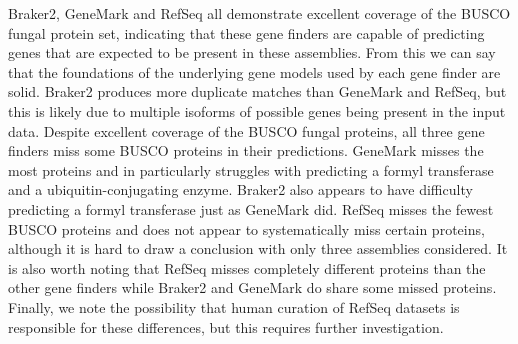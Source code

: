 
Braker2, GeneMark and RefSeq all demonstrate excellent coverage of the
BUSCO fungal protein set, indicating that these gene finders are
capable of predicting genes that are expected to be present in these
assemblies. From this we can say that the foundations of the
underlying gene models used by each gene finder are solid. Braker2
produces more duplicate matches than GeneMark and RefSeq, but this is
likely due to multiple isoforms of possible genes being present in the
input data. Despite excellent coverage of the BUSCO fungal proteins,
all three gene finders miss some BUSCO proteins in their
predictions. GeneMark misses the most proteins and in particularly
struggles with predicting a formyl transferase and a
ubiquitin-conjugating enzyme. Braker2 also appears to have difficulty
predicting a formyl transferase just as GeneMark did. RefSeq misses
the fewest BUSCO proteins and does not appear to systematically miss
certain proteins, although it is hard to draw a conclusion with only
three assemblies considered. It is also worth noting that RefSeq
misses completely different proteins than the other gene finders while
Braker2 and GeneMark do share some missed proteins. Finally, we note
the possibility that human curation of RefSeq datasets is responsible
for these differences, but this requires further investigation.
